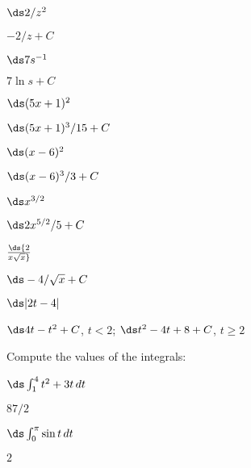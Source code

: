 \begin{theorem}
\begin{exercises}
\begin{exercise} $\ds 2/z^2$
\begin{answer} $-2/z+C$
\end{answer}\end{exercise}

\iflatetranscendentals
\else
\begin{exercise} $\ds 7s^{-1}$
\begin{answer} $7\ln s+C$
\end{answer}\end{exercise}
\fi

\begin{exercise} $\ds (5x+1)^2$
\begin{answer} $\ds (5x+1)^3/15+C$
\end{answer}\end{exercise}

\begin{exercise} $\ds (x-6)^2$
\begin{answer} $\ds (x-6)^3/3+C$
\end{answer}\end{exercise}

\begin{exercise} $\ds x^{3/2}$
\begin{answer} $\ds 2x^{5/2}/5+C$
\end{answer}\end{exercise}

\begin{exercise} $\ds {2\over x\sqrt x}$
\begin{answer} $\ds -4/\sqrt{x}+C$
\end{answer}\end{exercise}

\begin{exercise} $\ds |2t-4|$
\begin{answer} $\ds 4t-t^2+C$, $t<2$; $\ds t^2-4t+8+C$, $t\ge 2$
\end{answer}\end{exercise}

\endtwocol

\noindent
Compute the values of the integrals:

\twocol

\begin{exercise} $\ds \int_1^4 t^2+3t\,dt$
\begin{answer} $87/2$
\end{answer}\end{exercise}

\begin{exercise} $\ds \int_0^\pi \sin t\,dt$
\begin{answer} $2$
\end{answer}\end{exercise}


\end{exercises}
\end{theorem}
